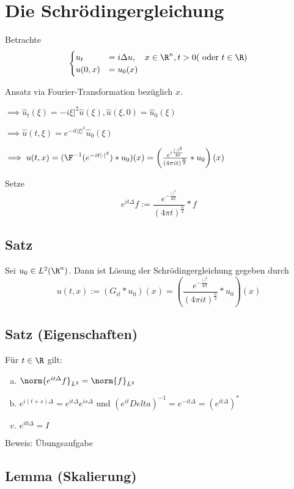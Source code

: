 \section{Die Schrödingergleichung}

Betrachte
$$
\begin{cases}
u_t &= i \Delta u, \quad x \in \R^n, t > 0 \text{( oder $t \in \R$)} \\
u(0,x) &= u_0(x)
\end{cases}
$$

Ansatz via Fourier-Transformation bezüglich $x$.

$\implies \hat u_t(\xi) = -i\xi|^2 \hat u(\xi), \hat u(\xi, 0) = \hat u_0 (\xi)$

$\implies \hat u(t, \xi) = e^{-it |\xi|^2} \hat u_0(\xi)$

$\implies u(t, x) = (\F^{-1}(e^{-it|\cdot|^2}) \ast u_0)(x) = \left( \frac{e^{i \frac{|\cdot|^2}{4t}}}{(4\pi i t)^{\frac{n}{2}}} \ast u_0 \right)(x)$

Setze
$$
e^{it\Delta} f:= \frac{e^{-\frac{|\cdot|^2}{4it}}}{(4\pi t)^{\frac{n}{2}}} \ast f
$$

\subsection{Satz}

Sei $u_0 \in L^2(\R^n)$. Dann ist Lösung der Schrödingergleichung gegeben durch
$$
u(t,x) := (G_{it} \ast u_0)(x) = \left( \frac{e^{-\frac{|\cdot|^2}{4it}}}{(4 \pi it)^{\frac{n}{2}}} \ast u_0 \right)(x)
$$

\subsection{Satz (Eigenschaften)}

Für $t \in \R$ gilt:
\begin{enumerate}[a)]
\item $\norm{e^{it\Delta} f}_{L^2} = \norm{f}_{L^2}$
\item $e^{i(t + s)\Delta} = e^{it\Delta} e^{i s\Delta}$ und $(e^{it}Delta)^{-1} = e^{-it\Delta} = \left(e^{it\Delta}\right)^*$
\item $e^{i 0 \Delta} = I$
\end{enumerate}

Beweis: Übungsaufgabe

\subsection{Lemma (Skalierung)}

